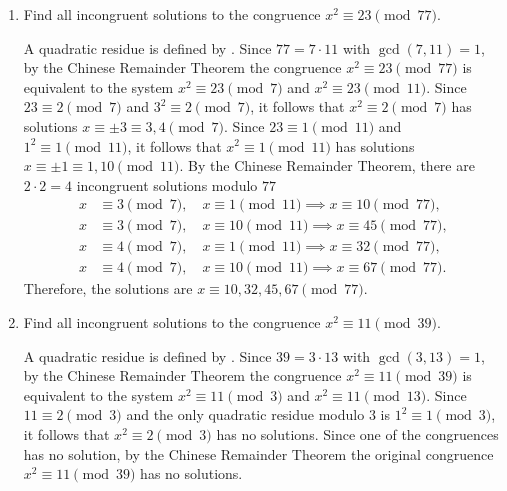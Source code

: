 \begin{enumerate}
  \newpage
  \item Find all incongruent solutions to the congruence $x^{2} \equiv 23 \pmod{77}$.
  \begin{subanswer}
    A quadratic residue is defined by . 
    Since $77 = 7 \cdot 11$ with $\gcd(7, 11) = 1$, by the Chinese Remainder Theorem the congruence $x^2 \equiv 23 \pmod{77}$ is equivalent to the system $x^2 \equiv 23 \pmod{7}$ and $x^2 \equiv 23 \pmod{11}$.
    Since $23 \equiv 2 \pmod{7}$ and $3^2 \equiv 2 \pmod{7}$, it follows that $x^2 \equiv 2 \pmod{7}$ has solutions $x \equiv \pm 3 \equiv 3, 4 \pmod{7}$.
    Since $23 \equiv 1 \pmod{11}$ and $1^2 \equiv 1 \pmod{11}$, it follows that $x^2 \equiv 1 \pmod{11}$ has solutions $x \equiv \pm 1 \equiv 1, 10 \pmod{11}$.
    By the Chinese Remainder Theorem, there are $2 \cdot 2 = 4$ incongruent solutions modulo $77$
    \begin{align*}
      x &\equiv 3 \pmod{7}, \quad x \equiv 1 \pmod{11} \implies x \equiv 10 \pmod{77},\\
      x &\equiv 3 \pmod{7}, \quad x \equiv 10 \pmod{11} \implies x \equiv 45 \pmod{77},\\
      x &\equiv 4 \pmod{7}, \quad x \equiv 1 \pmod{11} \implies x \equiv 32 \pmod{77},\\
      x &\equiv 4 \pmod{7}, \quad x \equiv 10 \pmod{11} \implies x \equiv 67 \pmod{77}.
    \end{align*}
    Therefore, the solutions are $x \equiv 10, 32, 45, 67 \pmod{77}$.
  \end{subanswer}
  


  
  \item Find all incongruent solutions to the congruence $x^{2} \equiv 11 \pmod{39}$.
  \begin{subanswer}
    A quadratic residue is defined by . 
    Since $39 = 3 \cdot 13$ with $\gcd(3, 13) = 1$, by the Chinese Remainder Theorem the congruence $x^2 \equiv 11 \pmod{39}$ is equivalent to the system $x^2 \equiv 11 \pmod{3}$ and $x^2 \equiv 11 \pmod{13}$.
    Since $11 \equiv 2 \pmod{3}$ and the only quadratic residue modulo $3$ is $1^2 \equiv 1 \pmod{3}$, it follows that $x^2 \equiv 2 \pmod{3}$ has no solutions.
    Since one of the congruences has no solution, by the Chinese Remainder Theorem the original congruence $x^2 \equiv 11 \pmod{39}$ has no solutions.
  \end{subanswer}
  

\end{enumerate}
